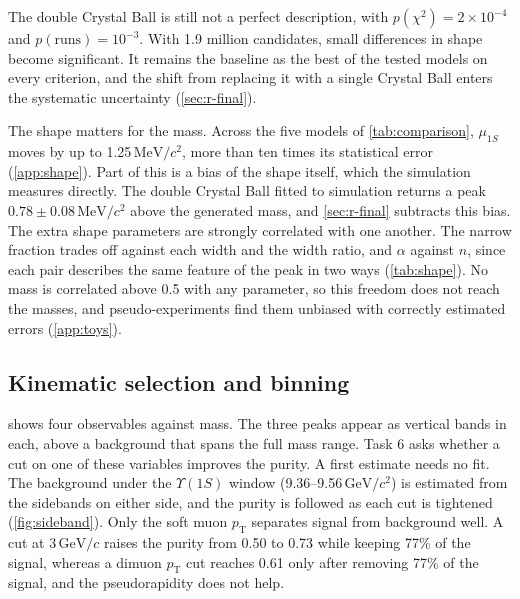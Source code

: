 \documentclass[a4paper,11pt]{article}
\newcommand{\MeVcc}{\ensuremath{\mathrm{MeV}/c^2}}
\newcommand{\GeVcc}{\ensuremath{\mathrm{GeV}/c^2}}
\newcommand{\GeVc}{\ensuremath{\mathrm{GeV}/c}}
\newcommand{\Ups}[1]{\ensuremath{\Upsilon(#1)}}               %
\newcommand{\pT}{\ensuremath{p_\mathrm{T}}}
\begin{document}
The double Crystal Ball is still not a perfect description, with $p(\chi^2) = 2\times10^{-4}$ and $p(\mathrm{runs}) = 10^{-3}$.
With 1.9 million candidates, small differences in shape become significant.
It remains the baseline as the best of the tested models on every criterion, and the shift from replacing it with a single Crystal Ball enters the systematic uncertainty (\cref{sec:r-final}).

The shape matters for the mass.
Across the five models of \cref{tab:comparison}, $\mu_{1S}$ moves by up to 1.25\,\MeVcc{}, more than ten times its statistical error (\cref{app:shape}).
Part of this is a bias of the shape itself, which the simulation measures directly.
The double Crystal Ball fitted to simulation returns a peak $0.78 \pm 0.08\,\MeVcc$ above the generated mass, and \cref{sec:r-final} subtracts this bias.
The extra shape parameters are strongly correlated with one another.
The narrow fraction trades off against each width and the width ratio, and $\alpha$ against $n$, since each pair describes the same feature of the peak in two ways (\cref{tab:shape}).
No mass is correlated above 0.5 with any parameter, so this freedom does not reach the masses, and pseudo-experiments find them unbiased with correctly estimated errors (\cref{app:toys}).

\subsection{Kinematic selection and binning}
\label{sec:r-selection}

 shows four observables against mass.
The three peaks appear as vertical bands in each, above a background that spans the full mass range.
Task 6 asks whether a cut on one of these variables improves the purity.
A first estimate needs no fit.
The background under the \Ups{1S} window (9.36--9.56\,\GeVcc{}) is estimated from the sidebands on either side, and the purity is followed as each cut is tightened (\cref{fig:sideband}).
Only the soft muon \pT{} separates signal from background well.
A cut at 3\,\GeVc{} raises the purity from 0.50 to 0.73 while keeping 77\% of the signal, whereas a dimuon \pT{} cut reaches 0.61 only after removing 77\% of the signal, and the pseudorapidity does not help.
\end{document}
